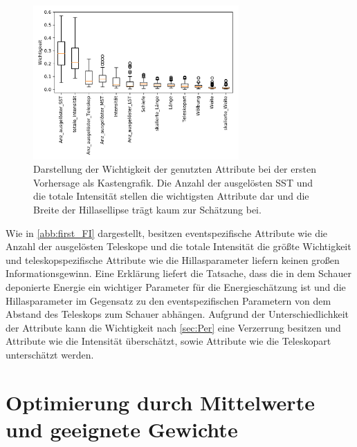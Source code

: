 \begin{figure}
  \includegraphics[width=0.7\textwidth]{Plots/feautureimportance_boxplot_firstForest.pdf}
  \centering
  \caption{Darstellung der Wichtigkeit der genutzten Attribute bei der ersten Vorhersage als Kastengrafik. Die Anzahl der ausgelösten SST und die totale Intensität
          stellen die wichtigsten Attribute dar und die Breite der Hillasellipse trägt kaum zur Schätzung bei.}
  \label{abb:first_FI}
\end{figure}
Wie in \autoref{abb:first_FI} dargestellt, besitzen eventspezifische Attribute wie die Anzahl der ausgelösten Teleskope und die totale Intensität die größte Wichtigkeit und teleskopspezifische Attribute
wie die Hillasparameter liefern keinen großen Informationsgewinn.
Eine Erklärung liefert die Tatsache, dass die in dem Schauer deponierte Energie ein wichtiger Parameter für die Energieschätzung ist und die Hillasparameter im
Gegensatz zu den eventspezifischen Parametern von dem Abstand des Teleskops zum Schauer abhängen.
Aufgrund der Unterschiedlichkeit der Attribute kann die Wichtigkeit nach \autoref{sec:Per} eine Verzerrung besitzen und Attribute
wie die Intensität überschätzt, sowie Attribute wie die Teleskopart unterschätzt werden.

\section{Optimierung durch Mittelwerte und geeignete Gewichte}


